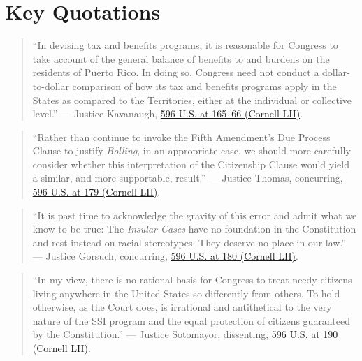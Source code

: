 \documentclass[12pt]{article}
\begin{document}
\section{Key Quotations}
\begin{quote}
  ``In devising tax and benefits programs, it is reasonable for Congress to take account of the general balance of benefits to and burdens on the residents of Puerto Rico. In doing so, Congress need not conduct a dollar-to-dollar comparison of how its tax and benefits programs apply in the States as compared to the Territories, either at the individual or collective level.''
  --- Justice Kavanaugh, \href{https://www.law.cornell.edu/supremecourt/text/20-303}{596 U.S. at 165--66 (Cornell LII)}.
\end{quote}
\begin{quote}
  ``Rather than continue to invoke the Fifth Amendment's Due Process Clause to justify \emph{Bolling}, in an appropriate case, we should more carefully consider whether this interpretation of the Citizenship Clause would yield a similar, and more supportable, result.''
  --- Justice Thomas, concurring, \href{https://www.law.cornell.edu/supremecourt/text/20-303}{596 U.S. at 179 (Cornell LII)}.
\end{quote}
\begin{quote}
  ``It is past time to acknowledge the gravity of this error and admit what we know to be true: The \emph{Insular Cases} have no foundation in the Constitution and rest instead on racial stereotypes. They deserve no place in our law.''
  --- Justice Gorsuch, concurring, \href{https://www.law.cornell.edu/supremecourt/text/20-303}{596 U.S. at 180 (Cornell LII)}.
\end{quote}
\begin{quote}
  ``In my view, there is no rational basis for Congress to treat needy citizens living anywhere in the United States so differently from others. To hold otherwise, as the Court does, is irrational and antithetical to the very nature of the SSI program and the equal protection of citizens guaranteed by the Constitution.''
  --- Justice Sotomayor, dissenting, \href{https://www.law.cornell.edu/supremecourt/text/20-303}{596 U.S. at 190 (Cornell LII)}.
\end{quote}
\end{document}
